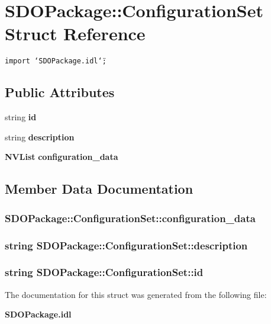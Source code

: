 \section{SDOPackage::Configuration\-Set Struct Reference}
\label{structSDOPackage_1_1ConfigurationSet}
{\tt import \char`\"{}SDOPackage.idl\char`\"{};}

\subsection*{Public Attributes}
\begin{CompactItemize}
\item 
string {\bf id}
\item 
string {\bf description}
\item 
{\bf NVList} {\bf configuration\_\-data}
\end{CompactItemize}


\subsection{Member Data Documentation}
\subsubsection{ {\bf SDOPackage::Configuration\-Set::configuration\_\-data}}\label{structSDOPackage_1_1ConfigurationSet_SDOPackage_1_1ConfigurationSeto2}


\subsubsection{\setlength{\rightskip}{0pt plus 5cm}string {\bf SDOPackage::Configuration\-Set::description}}\label{structSDOPackage_1_1ConfigurationSet_SDOPackage_1_1ConfigurationSeto1}


\subsubsection{\setlength{\rightskip}{0pt plus 5cm}string {\bf SDOPackage::Configuration\-Set::id}}\label{structSDOPackage_1_1ConfigurationSet_SDOPackage_1_1ConfigurationSeto0}




The documentation for this struct was generated from the following file:\begin{CompactItemize}
\item 
{\bf SDOPackage.idl}\end{CompactItemize}

